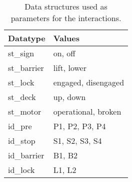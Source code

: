 \begin{table}[htb]%
\begin{tabular}{ll}
	\textbf{Datatype} & \textbf{Values}\\
	\hline
	st\_sign & on, off\\
	st\_barrier & lift, lower\\
	st\_lock & engaged, disengaged\\
	st\_deck & up, down\\
	st\_motor & operational, broken\\
	id\_pre & P1, P2, P3, P4\\
	id\_stop & S1, S2, S3, S4\\
	id\_barrier & B1, B2\\
	id\_lock & L1, L2\\
\end{tabular}
\caption{Data structures used as parameters for the interactions.}
\label{tab:types}
\end{table}

